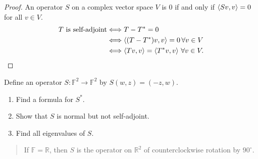\begin{proof}
    An operator $S$ on a complex vector space $V$ is $0$ if and only if $\left\langle{Sv, v}\right\rangle = 0$ for all $v\in V$.
    \begin{align*}
        \text{$T$ is self-adjoint} & \Longleftrightarrow T - T^{*} = 0 \\
                                   & \Longleftrightarrow \left\langle{(T - T^{*})v, v}\right\rangle = 0\,\forall v\in V \\
                                   & \Longleftrightarrow \left\langle{Tv, v}\right\rangle = \left\langle{T^{*}v, v}\right\rangle\,\forall v\in V.
    \end{align*}
\end{proof}
\newpage

\begin{exercise}
    Define an operator $S: \mathbb{F}^{2}\to \mathbb{F}^{2}$ by $S(w, z) = (-z, w)$.
    \begin{enumerate}[label={(\alph*)}]
        \item Find a formula for $S^{*}$.
        \item Show that $S$ is normal but not self-adjoint.
        \item Find all eigenvalues of $S$.
    \end{enumerate}
\end{exercise}

\begin{quote}
    If $\mathbb{F} = \mathbb{R}$, then $S$ is the operator on $\mathbb{R}^{2}$ of counterclockwise rotation by $90^{\circ}$.
\end{quote}

